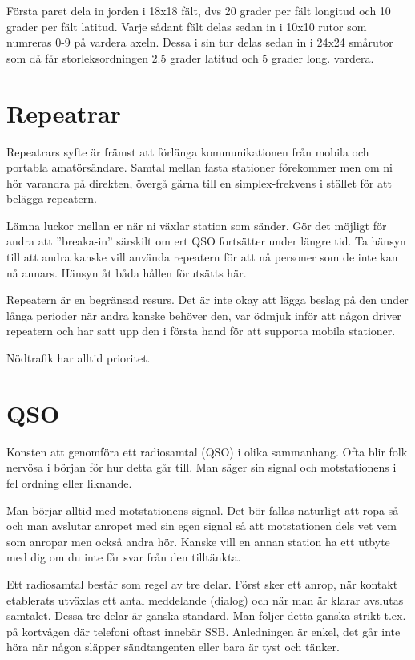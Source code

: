 Första paret dela in jorden i 18x18 fält, dvs 20 grader per fält longitud och 10
grader per fält latitud. Varje sådant fält delas sedan in i 10x10 rutor som
numreras 0-9 på vardera axeln. Dessa i sin tur delas sedan in i 24x24 smårutor
som då får storleksordningen 2.5 grader latitud och 5 grader long. vardera.



\section{Repeatrar}

Repeatrars syfte är främst att förlänga kommunikationen från mobila och portabla
amatörsändare. Samtal mellan fasta stationer förekommer men om ni hör varandra
på direkten, övergå gärna till en simplex-frekvens i stället för att belägga
repeatern.

Lämna luckor mellan er när ni växlar station som sänder. Gör det möjligt för
andra att ''breaka-in'' särskilt om ert QSO fortsätter under längre tid. Ta
hänsyn till att andra kanske vill använda repeatern för att nå personer som de
inte kan nå annars. Hänsyn åt båda hållen förutsätts här.

Repeatern är en begränsad resurs. Det är inte okay att lägga beslag på den under
långa perioder när andra kanske behöver den, var ödmjuk inför att någon driver
repeatern och har satt upp den i första hand för att supporta mobila stationer.

Nödtrafik har alltid prioritet.

\section{QSO}

Konsten att genomföra ett radiosamtal (QSO) i olika sammanhang. Ofta blir folk
nervösa i början för hur detta går till. Man säger sin signal och motstationens
i fel ordning eller liknande.

Man börjar alltid med motstationens signal. Det bör fallas naturligt att ropa så
och man avslutar anropet med sin egen signal så att motstationen dels vet vem
som anropar men också andra hör. Kanske vill en annan station ha ett utbyte med
dig om du inte får svar från den tilltänkta.

Ett radiosamtal består som regel av tre delar. Först sker ett anrop, när kontakt
etablerats utväxlas ett antal meddelande (dialog) och när man är klarar avslutas
samtalet. Dessa tre delar är ganska standard. Man följer detta ganska strikt
t.ex. på kortvågen där telefoni oftast innebär SSB. Anledningen är enkel, det
går inte höra när någon släpper sändtangenten eller bara är tyst och tänker.

